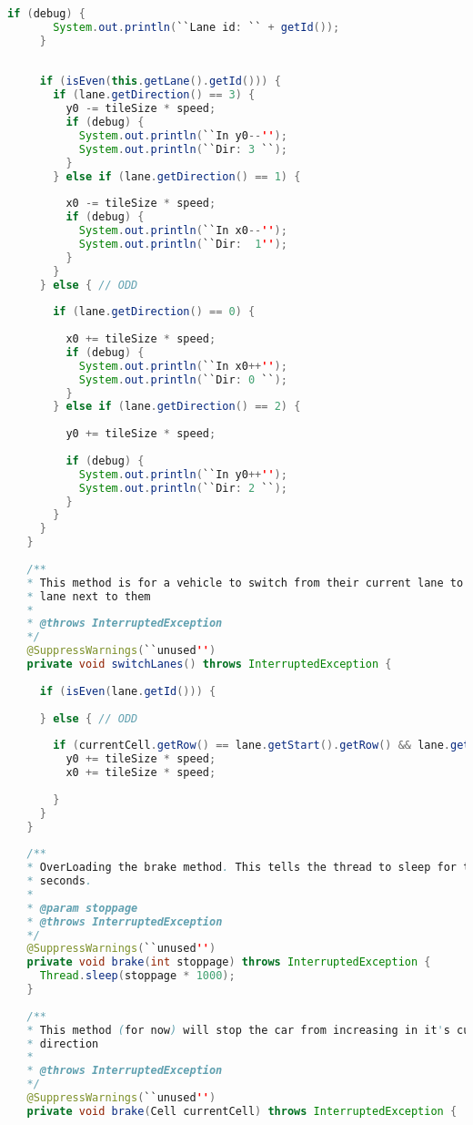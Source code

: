 \begin{lstlisting}[language=java]
     if (debug) {
       System.out.println(``Lane id: `` + getId());
     }
     
     
     if (isEven(this.getLane().getId())) {
       if (lane.getDirection() == 3) {
         y0 -= tileSize * speed;
         if (debug) {
           System.out.println(``In y0--'');
           System.out.println(``Dir: 3 ``);
         }
       } else if (lane.getDirection() == 1) {
         
         x0 -= tileSize * speed;
         if (debug) {
           System.out.println(``In x0--'');
           System.out.println(``Dir:  1'');
         }
       }
     } else { // ODD
       
       if (lane.getDirection() == 0) {
         
         x0 += tileSize * speed;
         if (debug) {
           System.out.println(``In x0++'');
           System.out.println(``Dir: 0 ``);
         }
       } else if (lane.getDirection() == 2) {
         
         y0 += tileSize * speed;
         
         if (debug) {
           System.out.println(``In y0++'');
           System.out.println(``Dir: 2 ``);
         }
       }
     }
   }
   
   /**
   * This method is for a vehicle to switch from their current lane to the
   * lane next to them
   * 
   * @throws InterruptedException
   */
   @SuppressWarnings(``unused'')
   private void switchLanes() throws InterruptedException {
     
     if (isEven(lane.getId())) {
       
     } else { // ODD
       
       if (currentCell.getRow() == lane.getStart().getRow() && lane.getDirection() == 0) {
         y0 += tileSize * speed;
         x0 += tileSize * speed;
         
       }
     }
   }
   
   /**
   * OverLoading the brake method. This tells the thread to sleep for time in
   * seconds.
   * 
   * @param stoppage
   * @throws InterruptedException
   */
   @SuppressWarnings(``unused'')
   private void brake(int stoppage) throws InterruptedException {
     Thread.sleep(stoppage * 1000);
   }
   
   /**
   * This method (for now) will stop the car from increasing in it's current
   * direction
   * 
   * @throws InterruptedException
   */
   @SuppressWarnings(``unused'')
   private void brake(Cell currentCell) throws InterruptedException {
     

\end{lstlisting}
